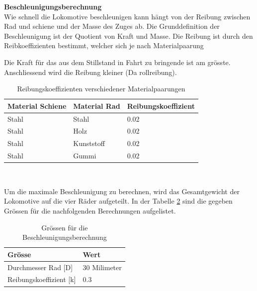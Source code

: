 \documentclass[../../main.tex]{subfiles}
\begin{document}
    \textbf{Beschleunigungsberechnung}\\
    Wie schnell die Lokomotive beschleunigen kann hängt von der Reibung zwischen Rad und schiene und der Masse des Zuges ab. Die Grunddefinition der Beschleunigung ist der Quotient von Kraft und Masse. Die Reibung ist durch den Reibkoeffizienten bestimmt, welcher sich je nach Materialpaarung 

    Die Kraft für das aus dem Stillstand in Fahrt zu bringende ist am grösste. Anschliessend wird die Reibung kleiner (Da rollreibung).

    \begin{table}[H] \centering
        \begin{tabular}{|l|l|l|}
        \hline
        \textbf{Material Schiene} & \textbf{Material Rad} & \textbf{Reibungskoeffizient}\\
        \hline
        Stahl                                & Stahl        & 0.02\\
         \hline
        Stahl                                & Holz         & 0.02\\
        \hline
        Stahl                                & Kunststoff   & 0.02\\
        \hline
        Stahl                                & Gummi        & 0.02\\
        \hline
        \end{tabular}\\
        
        \caption{Reibungskoeffizienten verschiedener Materialpaarungen}
        \label{tab:com_tiny_pi}
        \end{table}
    
    Um die maximale Beschleunigung zu berechnen, wird das Gesamtgewicht der Lokomotive auf die vier Räder aufgeteilt. In der Tabelle \ref{tab:groessen_beschleunigung} sind die gegeben Grössen für die nachfolgenden Berechnungen aufgelistet.

    \begin{table}[H] \centering
        \begin{tabular}{|l|l|}
        \hline
        \textbf{Grösse} & \textbf{Wert}\\
        \hline
        Durchmesser Rad [D]          & 30 Milimeter\\
         \hline
        Reibungskoeffizient [k]      & 0.3\\
        \hline
        \end{tabular}
        
        \caption{Grössen für die Beschleunigungsberechnung}
        \label{tab:groessen_beschleunigung}
        \end{table}   
\end{document}
